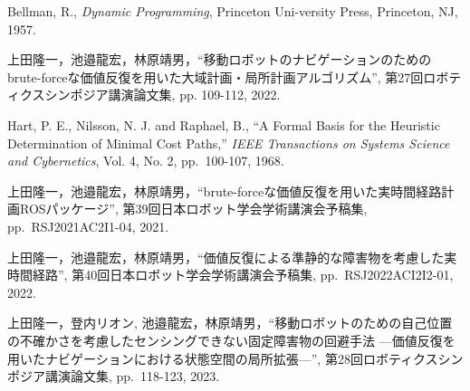 \documentclass{jarticle}
\begin{document}
\footnotesize
\begin{thebibliography}{99}

	Bellman, R., {\it Dynamic Programming}, Princeton Uni-versity Press, Princeton, NJ, 1957.

	上田隆一，池邉龍宏，林原靖男，``移動ロボットのナビゲーションのためのbrute-forceな価値反復を用いた大域計画・局所計画アルゴリズム'', 
	第27回ロボティクスシンポジア講演論文集, pp. 109-112, 2022.
	
	Hart, P. E., Nilsson, N. J. and Raphael, B., ``A Formal
	Basis for the Heuristic Determination of Minimal Cost
	Paths,'' {\it IEEE Transactions on Systems Science and Cybernetics}, Vol. 4, No. 2, pp.~100-107, 1968.
	
	上田隆一，池邉龍宏，林原靖男，``brute-forceな価値反復を用いた実時間経路計画ROSパッケージ'', 
	第39回日本ロボット学会学術講演会予稿集, pp.~RSJ2021AC2I1-04, 2021.

	上田隆一，池邉龍宏，林原靖男，``価値反復による準静的な障害物を考慮した実時間経路'', 
	第40回日本ロボット学会学術講演会予稿集, pp.~RSJ2022ACI2I2-01, 2022.

	上田隆一，登内リオン, 池邉龍宏，林原靖男，``移動ロボットのための自己位置の不確かさを考慮したセンシングできない固定障害物の回避手法 ---価値反復を用いたナビゲーションにおける状態空間の局所拡張---'', 
	第28回ロボティクスシンポジア講演論文集, pp.~118-123, 2023.

\end{thebibliography}

\normalsize
\end{document}
